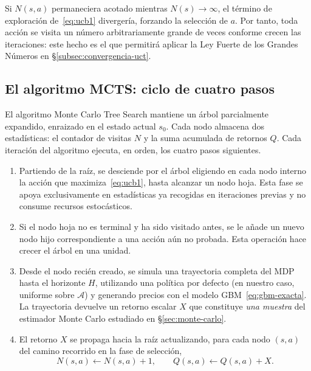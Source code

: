 \begin{observacion}
\label{obs:visitas}
Si $N(s,a)$ permaneciera acotado mientras $N(s) \to \infty$, el término de exploración de~\eqref{eq:ucb1} divergería, forzando la selección de $a$. Por tanto, toda acción se visita un número arbitrariamente grande de veces conforme crecen las iteraciones: este hecho es el que permitirá aplicar la Ley Fuerte de los Grandes Números en §\ref{subsec:convergencia-uct}.
\end{observacion}

\subsection{El algoritmo MCTS: ciclo de cuatro pasos}
\label{subsec:mcts-4pasos}

El algoritmo Monte Carlo Tree Search mantiene un árbol parcialmente expandido, enraizado en el estado actual $s_0$. Cada nodo almacena dos estadísticas: el contador de visitas $N$ y la suma acumulada de retornos $Q$. Cada iteración del algoritmo ejecuta, en orden, los cuatro pasos siguientes.

\begin{enumerate}
    \item[\textbf{(1) Selección.}] Partiendo de la raíz, se desciende por el árbol eligiendo en cada nodo interno la acción que maximiza~\eqref{eq:ucb1}, hasta alcanzar un nodo hoja. Esta fase se apoya exclusivamente en estadísticas ya recogidas en iteraciones previas y no consume recursos estocásticos.

    \item[\textbf{(2) Expansión.}] Si el nodo hoja no es terminal y ha sido visitado antes, se le añade un nuevo nodo hijo correspondiente a una acción aún no probada. Esta operación hace crecer el árbol en una unidad.

    \item[\textbf{(3) Rollout.}] Desde el nodo recién creado, se simula una trayectoria completa del MDP hasta el horizonte $H$, utilizando una política por defecto (en nuestro caso, uniforme sobre $\mathcal{A}$) y generando precios con el modelo GBM~\eqref{eq:gbm-exacta}. La trayectoria devuelve un retorno escalar $X$ que constituye \emph{una muestra} del estimador Monte Carlo estudiado en §\ref{sec:monte-carlo}.

    \item[\textbf{(4) Retropropagación.}] El retorno $X$ se propaga hacia la raíz actualizando, para cada nodo $(s,a)$ del camino recorrido en la fase de selección,
    \[
        N(s,a) \leftarrow N(s,a) + 1, \qquad Q(s,a) \leftarrow Q(s,a) + X.
    \]
\end{enumerate}

